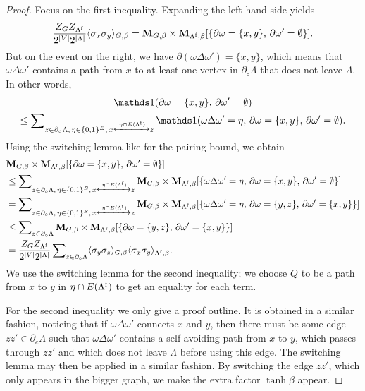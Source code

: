 \begin{proof}
    Focus on the first inequality.
    Expanding the left hand side yields
    \[
        \frac{Z_GZ_{\Lambda^{\operatorname{f}}}}{2^{|V|}2^{|\Lambda|}}
        \langle\sigma_x\sigma_y\rangle_{G,\beta}
        =
        \mathbf{M}_{G,\beta}\times\mathbf{M}_{\Lambda^{\operatorname{f}},\beta}[\{\partial\omega=\{x,y\},\,\partial\omega'=\emptyset\}].
    \]
    But on the event on the right,
    we have $\partial(\omega\Delta\omega')=\{x,y\}$,
    which means that $\omega\Delta\omega'$ contains a path
    from $x$ to at least one vertex in $\partial_\circ\Lambda$
    that does not leave $\Lambda$.
    In other words,
    \begin{multline}
        \true{\partial\omega=\{x,y\},\,\partial\omega'=\emptyset}
        \\
        \leq
        \sum\nolimits_{z\in\partial_\circ\Lambda,\,\eta\in\{0,1\}^E,\,x\xleftrightarrow{\eta\cap E(\Lambda^\f)}z}
        \true{\omega\Delta\omega'=\eta,\,\partial\omega=\{x,y\},\,\partial\omega'=\emptyset}.
    \end{multline}
    Using the switching lemma like for the pairing bound,
    we obtain
    \begin{align}
        &\mathbf{M}_{G,\beta}\times\mathbf{M}_{\Lambda^{\operatorname{f}},\beta}[\{\partial\omega=\{x,y\},\,\partial\omega'=\emptyset\}]
        \\&
        \leq 
        \sum\nolimits_{z\in\partial_\circ\Lambda,\,\eta\in\{0,1\}^E,\,x\xleftrightarrow{\eta\cap E(\Lambda^{\operatorname{f}})}z}
        \mathbf{M}_{G,\beta}\times\mathbf{M}_{\Lambda^{\operatorname{f}},\beta}[
        \{\omega\Delta\omega'=\eta,\,\partial\omega=\{x,y\},\,\partial\omega'=\emptyset\}]
        \\&
        =
        \sum\nolimits_{z\in\partial_\circ\Lambda,\,\eta\in\{0,1\}^E,\,x\xleftrightarrow{\eta\cap E(\Lambda^{\operatorname{f}})}z}
        \mathbf{M}_{G,\beta}\times\mathbf{M}_{\Lambda^{\operatorname{f}},\beta}[
        \{\omega\Delta\omega'=\eta,\,\partial\omega=\{y,z\},\,\partial\omega'=\{x,y\}\}]
        \\&
        \leq
        \sum\nolimits_{z\in\partial_\circ\Lambda}
        \mathbf{M}_{G,\beta}\times\mathbf{M}_{\Lambda^{\operatorname{f}},\beta}[
        \{\partial\omega=\{y,z\},\,\partial\omega'=\{x,y\}\}]
        \\&=
        \frac{Z_GZ_{\Lambda^{\operatorname{f}}}}{2^{|V|}2^{|\Lambda|}}
        \sum\nolimits_{z\in\partial_\circ\Lambda}
        \langle\sigma_y\sigma_z\rangle_{G,\beta}
        \langle\sigma_x\sigma_y\rangle_{\Lambda^{\operatorname{f}},\beta}.
    \end{align}
    We use the switching lemma for the second inequality;
    we choose $Q$ to be a path from $x$ to $y$ in $\eta\cap E(\Lambda^{\operatorname{f}})$
    to get an equality for each term.

    For the second inequality we only give a proof outline.
    It is obtained in a similar fashion,
    noticing that if $\omega\Delta\omega'$ connects
    $x$ and $y$,
    then there must be some edge $zz'\in\partial_e\Lambda$
    such that $\omega\Delta\omega'$ contains a self-avoiding path
    from $x$ to $y$, which passes through $zz'$ 
    and which does not leave $\Lambda$ before using this edge.
    The switching lemma may then be applied in a similar fashion.
    By switching the edge $zz'$, which only appears in the bigger
    graph,
    we make the extra factor $\tanh\beta$ appear.
\end{proof}
